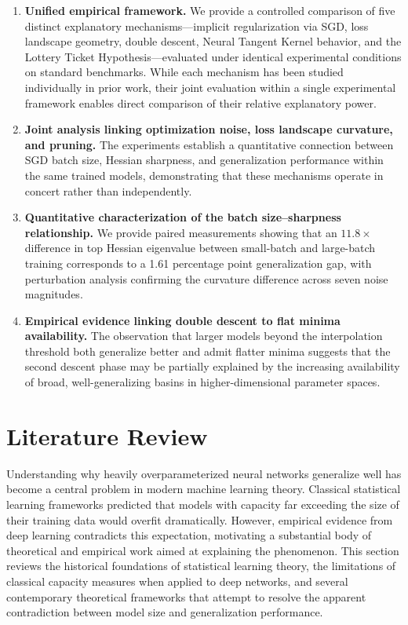 \documentclass[conference]{IEEEtran}
\begin{document}
\begin{enumerate}
    \item \textbf{Unified empirical framework.} We provide a controlled comparison of five distinct explanatory mechanisms---implicit regularization via SGD, loss landscape geometry, double descent, Neural Tangent Kernel behavior, and the Lottery Ticket Hypothesis---evaluated under identical experimental conditions on standard benchmarks. While each mechanism has been studied individually in prior work, their joint evaluation within a single experimental framework enables direct comparison of their relative explanatory power.
    \item \textbf{Joint analysis linking optimization noise, loss landscape curvature, and pruning.} The experiments establish a quantitative connection between SGD batch size, Hessian sharpness, and generalization performance within the same trained models, demonstrating that these mechanisms operate in concert rather than independently.
    \item \textbf{Quantitative characterization of the batch size--sharpness relationship.} We provide paired measurements showing that an $11.8\times$ difference in top Hessian eigenvalue between small-batch and large-batch training corresponds to a 1.61 percentage point generalization gap, with perturbation analysis confirming the curvature difference across seven noise magnitudes.
    \item \textbf{Empirical evidence linking double descent to flat minima availability.} The observation that larger models beyond the interpolation threshold both generalize better and admit flatter minima suggests that the second descent phase may be partially explained by the increasing availability of broad, well-generalizing basins in higher-dimensional parameter spaces.
\end{enumerate}

\section{Literature Review}

Understanding why heavily overparameterized neural networks generalize well has become a central problem in modern machine learning theory. Classical statistical learning frameworks predicted that models with capacity far exceeding the size of their training data would overfit dramatically. However, empirical evidence from deep learning contradicts this expectation, motivating a substantial body of theoretical and empirical work aimed at explaining the phenomenon. This section reviews the historical foundations of statistical learning theory, the limitations of classical capacity measures when applied to deep networks, and several contemporary theoretical frameworks that attempt to resolve the apparent contradiction between model size and generalization performance.
\end{document}
